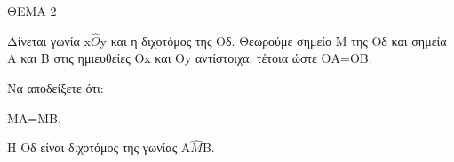 
ΘΕΜΑ 2

Δίνεται γωνία x$\widehat{O}$y και η διχοτόμος της Οδ. Θεωρούμε σημείο Μ της Οδ και σημεία Α και Β στις ημιευθείες Οx και Oy αντίστοιχα, τέτοια ώστε ΟΑ=ΟΒ.

Να αποδείξετε ότι:

\begin{alist}
\item MA=MB, 

\item Η Οδ είναι διχοτόμος της γωνίας Α$\widehat{Μ}$Β. 
\end{alist}
